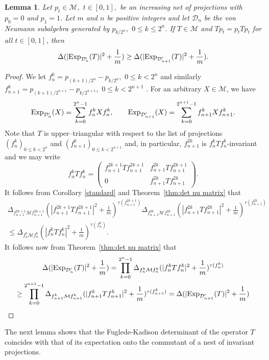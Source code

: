 \documentclass{amsart}
\theoremstyle{plain}
\newtheorem{lem}[thm]{Lemma}
\theoremstyle{remark}
\begin{document}
\begin{lem}\label{vspom lemma} Let $p_t\in\mathcal{M},$ $t\in[0,1],$ be an increasing net of projections with $p_0=0$ and $p_1=1$.
Let $m$ and $n$ be positive integers
and let $\mathcal{D}_n$ be the von Neumann subalgebra generated by $p_{k/2^n},$ $0\leq k\leq 2^n.$ If $T\in\mathcal{M}$ and $Tp_t=p_tTp_t$ for all $t\in[0,1]$, then
$$\Delta(|{\rm Exp}_{\mathcal{D}_n'}(T)|^2+\frac1m)\geq \Delta(|{\rm Exp}_{\mathcal{D}_{n+1}'}(T)|^2+\frac1m).$$
\end{lem}
\begin{proof} We let $f_n^k=p_{(k+1)/2^n}-p_{k/2^n},$ $0\leq k<2^n$ and similarly $f_{n+1}^k=p_{(k+1)/2^{n+1}}-p_{k/2^{n+1}},$ $0\leq k<2^{n+1}$ .
For an arbitrary $X\in\mathcal{M}$, we have
\[
{\rm Exp}_{\mathcal{D}_n'}(X)=\sum_{k=0}^{2^n-1}f_n^kXf_n^k,\qquad
{\rm Exp}_{\mathcal{D}_{n+1}'}(X)=\sum_{k=0}^{2^{n+1}-1}f_{n+1}^kXf_{n+1}^k.
\]
Note that $T$ is upper--triangular with respect to the list of projections $(f_n^k)_{0\le k<2^n}$ and $(f_{n+1}^k)_{0\le k<2^{n+1}}$
and, in particular,
$f_{n+1}^{2k}$ is $f_n^kTf_n^k$-invariant and we may write
$$f_n^kTf_n^k=\begin{pmatrix}
f_{n+1}^{2k+1}Tf_{n+1}^{2k+1}&f_{n+1}^{2k}Tf_{n+1}^{2k+1}\\
0&f_{n+1}^{2k}Tf_{n+1}^{2k}
\end{pmatrix}.$$
It follows from Corollary \ref{standard} and Theorem~\ref{thm:det nu matrix} that
\begin{multline*}
\Delta_{f_{n+1}^{2k+1}\mathcal{M}f_{n+1}^{2k+1}}(|f_{n+1}^{2k+1}Tf_{n+1}^{2k+1}|^2+\frac1m)^{\tau(f_{n+1}^{2k+1})}\Delta_{f_{n+1}^{2k}\mathcal{M}f_{n+1}^{2k}}(|f_{n+1}^{2k}Tf_{n+1}^{2k}|^2+\frac1m)^{\tau(f_{n+1}^{2k})} \\
\leq\Delta_{f_n^k\mathcal{M}f_n^k}(|f_n^kTf_n^k|^2+\frac1m)^{\tau(f^k_n)}.
\end{multline*}
It follows now from Theorem~\ref{thm:det nu matrix} that
\begin{multline*}
\Delta(|{\rm Exp}_{\mathcal{D}_n'}(T)|^2+\frac1m)=\prod_{k=0}^{2^n-1}\Delta_{f_n^k\mathcal{M}f_n^k}(|f_n^kTf_n^k|^2+\frac1m)^{\tau(f^k_n)} \\
\geq\prod_{k=0}^{2^{n+1}-1}\Delta_{f_{n+1}^k\mathcal{M}f_{n+1}^k}(|f_{n+1}^kTf_{n+1}^k|^2+\frac1m)^{\tau(f^k_{n+1})}=\Delta(|{\rm Exp}_{\mathcal{D}_{n+1}'}(T)|^2+\frac1m)
\end{multline*}
\end{proof}

The next lemma shows that the Fuglede-Kadison determinant of the operator $T$ coincides with that of its expectation onto the commutant of a nest of invariant projections.
\end{document}
